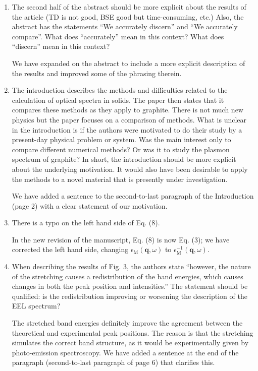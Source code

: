\documentclass[aps,prb,10pt,endfloats]{revtex4-1}
\begin{document}
\begin{enumerate}

\item
The second half of the abstract should be more explicit about the results of the
article (TD is not good, BSE good but time-consuming, etc.) Also, the abstract
has the statements ``We accurately discern'' and ``We accurately compare''. What
does ``accurately'' mean in this context? What does ``discern'' mean in this
context?
\begin{shaded*}
We have expanded on the abstract to include a more explicit description of the
results and improved some of the phrasing therein.
\end{shaded*}

\item
The introduction describes the methods and difficulties related to the
calculation of optical spectra in solids. The paper then states that it compares
these methods as they apply to graphite. There is not much new physics but the
paper focuses on a comparison of methods. What is unclear in the introduction is
if the authors were motivated to do their study by a present-day physical
problem or system. Was the main interest only to compare different numerical
methods? Or was it to study the plasmon spectrum of graphite? In short, the
introduction should be more explicit about the underlying motivation. It would
also have been desirable to apply the methods to a novel material that is
presently under investigation.
\begin{shaded*}
We have added a sentence to the second-to-last paragraph of the Introduction
(page 2) with a clear statement of our motivation.
\end{shaded*}

\item
There is a typo on the left hand side of Eq. (8).
\begin{shaded*}
In the new revision of the manuscript, Eq. (8) is now Eq. (3); we have corrected
the left hand side, changing $\epsilon_{\mathrm{M}}(\mathbf{q},
\omega)$ to $\epsilon^{-1}_{\mathrm{M}}(\mathbf{q}, \omega)$.
\end{shaded*}

\item
When describing the results of Fig. 3, the authors state ``however, the nature
of the stretching causes a redistribution of the band energies, which causes
changes in both the peak position and intensities.'' The statement should be
qualified: is the redistribution improving or worsening the description of the
EEL spectrum?
\begin{shaded*}
The stretched band energies definitely improve the agreement between the
theoretical and experimental peak positions. The reason is that the stretching simulates 
the correct band structure, as it would be experimentally given by photo-emission 
spectroscopy. We have added a sentence at the end
of the paragraph (second-to-last paragraph of page 6) that clarifies this.
\end{shaded*}


\end{enumerate}
\end{document}

